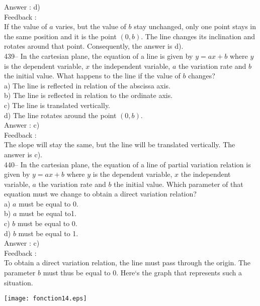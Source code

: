 ﻿\documentclass[letterpaper, 12pt]{article}
\begin{document}
Answer : d)\\

Feedback : \\
If the value of $a$ varies, but the value of $b$ stay unchanged, only one point stays in the same position and it is the point $(0,b)$.  The line changes its inclination and rotates around that point.  Consequently,
the answer is d).\\

439-- In the cartesian plane, the equation of a line is given by 
$y=ax+b$ where $y$ is the dependent variable, $x$ the independent variable, $a$ the variation rate and $b$ the initial value.
What happens to the line if the value of $b$ changes?\\
a) The line is reflected in relation of the abscissa axis.\\
b) The line is reflected in relation to the ordinate axis.\\
c) The line is translated vertically.\\
d) The line rotates around the point $(0,b)$.\\

Answer : c)\\

Feedback : \\
The slope will stay the same, but the line will be translated vertically.  The answer is c).\\

440-- In the cartesian plane, the equation of a line of partial variation relation is given by 
$y=ax+b$ where $y$ is the dependent variable, $x$ the independent variable, $a$ the variation rate and $b$ the initial value. Which parameter of that equation must we change to obtain a direct variation relation?\\
a) $a$ must be equal to 0.\\
b) $a$ must be equal to1.\\
c) $b$ must be equal to 0.\\
d) $b$ must be equal to 1.\\

Answer : c)\\

Feedback : \\
To obtain a direct variation relation, the line must pass through the origin. The parameter $b$ must thus be equal to 0.
Here`s the graph that represents such a situation.  \\
    \begin{center}
    \texttt{[image: fonction14.eps]}
    \end{center}
\end{document}
